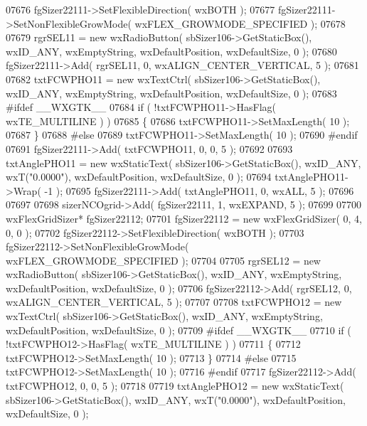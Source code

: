 \begin{DoxyCode}
07676     fgSizer22111->SetFlexibleDirection( wxBOTH );
07677     fgSizer22111->SetNonFlexibleGrowMode( wxFLEX\_GROWMODE\_SPECIFIED );
07678     
07679     rgrSEL11 = \textcolor{keyword}{new} wxRadioButton( sbSizer106->GetStaticBox(), wxID\_ANY, wxEmptyString, wxDefaultPosition, 
      wxDefaultSize, 0 );
07680     fgSizer22111->Add( rgrSEL11, 0, wxALIGN\_CENTER\_VERTICAL, 5 );
07681     
07682     txtFCWPHO11 = \textcolor{keyword}{new} wxTextCtrl( sbSizer106->GetStaticBox(), wxID\_ANY, wxEmptyString, wxDefaultPosition, 
      wxDefaultSize, 0 );
07683 \textcolor{preprocessor}{    #ifdef \_\_WXGTK\_\_}
07684     \textcolor{keywordflow}{if} ( !txtFCWPHO11->HasFlag( wxTE\_MULTILINE ) )
07685     \{
07686     txtFCWPHO11->SetMaxLength( 10 );
07687     \}
07688 \textcolor{preprocessor}{    #else}
07689     txtFCWPHO11->SetMaxLength( 10 );
07690 \textcolor{preprocessor}{    #endif}
07691     fgSizer22111->Add( txtFCWPHO11, 0, 0, 5 );
07692     
07693     txtAnglePHO11 = \textcolor{keyword}{new} wxStaticText( sbSizer106->GetStaticBox(), wxID\_ANY, wxT(\textcolor{stringliteral}{"0.0000"}), 
      wxDefaultPosition, wxDefaultSize, 0 );
07694     txtAnglePHO11->Wrap( -1 );
07695     fgSizer22111->Add( txtAnglePHO11, 0, wxALL, 5 );
07696     
07697     
07698     sizerNCOgrid->Add( fgSizer22111, 1, wxEXPAND, 5 );
07699     
07700     wxFlexGridSizer* fgSizer22112;
07701     fgSizer22112 = \textcolor{keyword}{new} wxFlexGridSizer( 0, 4, 0, 0 );
07702     fgSizer22112->SetFlexibleDirection( wxBOTH );
07703     fgSizer22112->SetNonFlexibleGrowMode( wxFLEX\_GROWMODE\_SPECIFIED );
07704     
07705     rgrSEL12 = \textcolor{keyword}{new} wxRadioButton( sbSizer106->GetStaticBox(), wxID\_ANY, wxEmptyString, wxDefaultPosition, 
      wxDefaultSize, 0 );
07706     fgSizer22112->Add( rgrSEL12, 0, wxALIGN\_CENTER\_VERTICAL, 5 );
07707     
07708     txtFCWPHO12 = \textcolor{keyword}{new} wxTextCtrl( sbSizer106->GetStaticBox(), wxID\_ANY, wxEmptyString, wxDefaultPosition, 
      wxDefaultSize, 0 );
07709 \textcolor{preprocessor}{    #ifdef \_\_WXGTK\_\_}
07710     \textcolor{keywordflow}{if} ( !txtFCWPHO12->HasFlag( wxTE\_MULTILINE ) )
07711     \{
07712     txtFCWPHO12->SetMaxLength( 10 );
07713     \}
07714 \textcolor{preprocessor}{    #else}
07715     txtFCWPHO12->SetMaxLength( 10 );
07716 \textcolor{preprocessor}{    #endif}
07717     fgSizer22112->Add( txtFCWPHO12, 0, 0, 5 );
07718     
07719     txtAnglePHO12 = \textcolor{keyword}{new} wxStaticText( sbSizer106->GetStaticBox(), wxID\_ANY, wxT(\textcolor{stringliteral}{"0.0000"}), 
      wxDefaultPosition, wxDefaultSize, 0 );

\end{DoxyCode}
